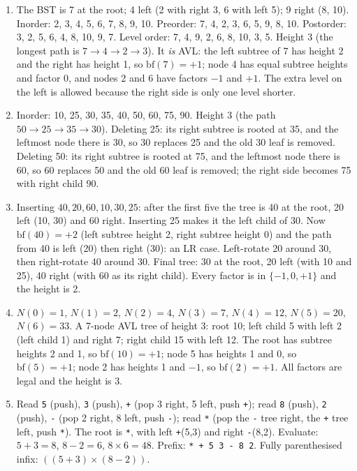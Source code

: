 \documentclass[11pt]{article}
\theoremstyle{definition}
\begin{document}
\begingroup\small
\begin{enumerate}
  \item The BST is 7 at the root; 4 left (2 with right 3, 6 with left 5);
    9 right (8, 10). Inorder: 2, 3, 4, 5, 6, 7, 8, 9, 10. Preorder: 7, 4, 2,
    3, 6, 5, 9, 8, 10. Postorder: 3, 2, 5, 6, 4, 8, 10, 9, 7. Level order:
    7, 4, 9, 2, 6, 8, 10, 3, 5. Height 3 (the longest path is
    $7\to4\to2\to3$). It \emph{is} AVL: the left subtree of 7 has height 2
    and the right has height 1, so $\mathrm{bf}(7)=+1$; node 4 has equal
    subtree heights and factor 0, and nodes 2 and 6 have factors $-1$ and
    $+1$. The extra level on the left is allowed because the right side is
    only one level shorter.
  \item Inorder: 10, 25, 30, 35, 40, 50, 60, 75, 90. Height 3 (the path
    $50\to25\to35\to30$). Deleting 25: its right subtree is rooted at 35, and
    the leftmost node there is 30, so 30 replaces 25 and the old 30 leaf is
    removed. Deleting 50: its right subtree is rooted at 75, and the
    leftmost node there is 60, so 60 replaces 50 and the old 60 leaf is
    removed; the right side becomes 75 with right child 90.
  \item Inserting $40,20,60,10,30,25$: after the first five the tree is 40 at
    the root, 20 left (10, 30) and 60 right. Inserting 25 makes it the left
    child of 30. Now $\mathrm{bf}(40)=+2$ (left subtree height 2, right
    subtree height 0) and the path from 40 is left (20) then right (30): an
    LR case. Left-rotate 20 around 30, then right-rotate 40 around 30. Final
    tree: 30 at the root, 20 left (with 10 and 25), 40 right (with 60 as its
    right child). Every factor is in $\{-1,0,+1\}$ and the height is 2.
  \item $N(0)=1$, $N(1)=2$, $N(2)=4$, $N(3)=7$, $N(4)=12$, $N(5)=20$,
    $N(6)=33$. A 7-node AVL tree of height 3: root 10; left child 5 with
    left 2 (left child 1) and right 7; right child 15 with left 12. The root
    has subtree heights 2 and 1, so $\mathrm{bf}(10)=+1$; node 5 has heights
    1 and 0, so $\mathrm{bf}(5)=+1$; node 2 has heights 1 and $-1$, so
    $\mathrm{bf}(2)=+1$. All factors are legal and the height is 3.
  \item Read \texttt{5} (push), \texttt{3} (push), \texttt{+} (pop 3 right,
    5 left, push \texttt{+}); read \texttt{8} (push), \texttt{2} (push),
    \texttt{-} (pop 2 right, 8 left, push \texttt{-}); read \texttt{*}
    (pop the \texttt{-} tree right, the \texttt{+} tree left, push
    \texttt{*}). The root is \texttt{*}, with left \texttt{+}(5,3) and right
    \texttt{-}(8,2). Evaluate: $5+3=8$, $8-2=6$, $8\times6=48$. Prefix:
    \texttt{* + 5 3 - 8 2}. Fully parenthesised infix:
    $((5+3)\times(8-2))$.
\end{enumerate}
\endgroup



\end{document}
